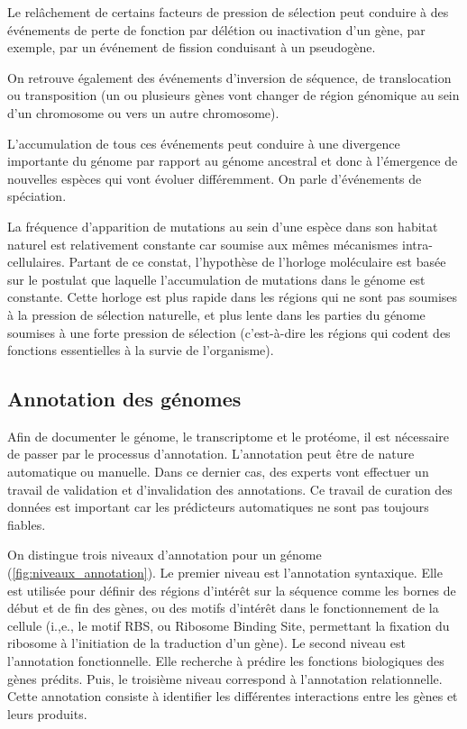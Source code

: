 \begin{refsegment}
    Le relâchement de certains facteurs de pression de sélection peut conduire à des événements de perte de fonction par délétion ou inactivation d'un gène, par exemple, par un événement de fission conduisant à un pseudogène.
    
    On retrouve également des événements d'inversion de séquence, de translocation ou transposition (un ou plusieurs gènes vont changer de région génomique au sein d'un chromosome ou vers un autre chromosome).
    
    L'accumulation de tous ces événements peut conduire à une divergence importante du génome par rapport au génome ancestral et donc à l'émergence de nouvelles espèces qui vont évoluer différemment. On parle d'événements de spéciation.
    
    La fréquence d'apparition de mutations au sein d'une espèce dans son habitat naturel est relativement constante car soumise aux mêmes mécanismes intra-cellulaires. Partant de ce constat, l'hypothèse de l'horloge moléculaire est basée sur le postulat que  laquelle l'accumulation de mutations dans le génome est constante. Cette horloge est plus rapide dans les régions qui ne sont pas soumises à la pression de sélection naturelle, et plus lente dans les parties du génome soumises à une forte pression de sélection (c'est-à-dire les régions qui codent des fonctions essentielles à la survie de l'organisme).
    
    
    \subsection{Annotation des génomes}\label{subsec:annotation}
    
    Afin de documenter le génome, le transcriptome et le protéome, il est nécessaire de passer par le processus d'annotation. L'annotation peut être de nature automatique ou manuelle. Dans ce dernier cas, des experts vont effectuer un travail de validation et d'invalidation des annotations. Ce travail de curation des données est important car les prédicteurs automatiques ne sont pas toujours fiables.
    
    On distingue trois niveaux d'annotation pour un génome (\cref{fig:niveaux_annotation}). Le premier niveau est l'annotation syntaxique. Elle est utilisée pour définir des régions d'intérêt sur la séquence comme les bornes de début et de fin des gènes, ou des motifs d'intérêt dans le fonctionnement de la cellule (i.,e., le motif RBS, ou Ribosome Binding Site, permettant la fixation du ribosome à l'initiation de la traduction d'un gène).  Le second niveau est l'annotation fonctionnelle. Elle recherche à prédire les fonctions biologiques des gènes prédits. Puis, le troisième niveau correspond à l'annotation relationnelle. Cette annotation consiste à identifier les différentes interactions entre les gènes et leurs produits.
    

\end{refsegment}
